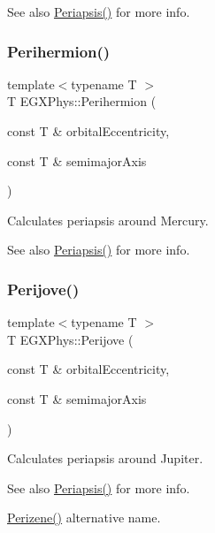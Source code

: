 \begin{DoxySeeAlso}{See also}
\hyperlink{group___e_g_x_phys-_periapsis_ga4414ac75539371ec874a3d25cad6c9fe}{Periapsis()} for more info. 
\end{DoxySeeAlso}
\mbox{\label{group___e_g_x_phys-_periapsis_ga9562e9cbfd73019ae9cdaa643b843d63}} 
\subsubsection{\texorpdfstring{Perihermion()}{Perihermion()}}
{\footnotesize\ttfamily template$<$typename T $>$ \\
T E\+G\+X\+Phys\+::\+Perihermion (\begin{DoxyParamCaption}\item[{const T \&}]{orbital\+Eccentricity,  }\item[{const T \&}]{semimajor\+Axis }\end{DoxyParamCaption})}



Calculates periapsis around Mercury. 

\begin{DoxySeeAlso}{See also}
\hyperlink{group___e_g_x_phys-_periapsis_ga4414ac75539371ec874a3d25cad6c9fe}{Periapsis()} for more info. 
\end{DoxySeeAlso}
\mbox{\label{group___e_g_x_phys-_periapsis_ga075052f7ff9aa1d5fdf4501b493be86b}} 
\subsubsection{\texorpdfstring{Perijove()}{Perijove()}}
{\footnotesize\ttfamily template$<$typename T $>$ \\
T E\+G\+X\+Phys\+::\+Perijove (\begin{DoxyParamCaption}\item[{const T \&}]{orbital\+Eccentricity,  }\item[{const T \&}]{semimajor\+Axis }\end{DoxyParamCaption})}



Calculates periapsis around Jupiter. 

\begin{DoxySeeAlso}{See also}
\hyperlink{group___e_g_x_phys-_periapsis_ga4414ac75539371ec874a3d25cad6c9fe}{Periapsis()} for more info. 

\hyperlink{group___e_g_x_phys-_periapsis_ga0523c65b7fc26e675388b2c3d38aa00b}{Perizene()} alternative name. 
\end{DoxySeeAlso}
\mbox{\label{group___e_g_x_phys-_periapsis_gaa56f74c44a3583b8f0d13b821c1d7422}} 
